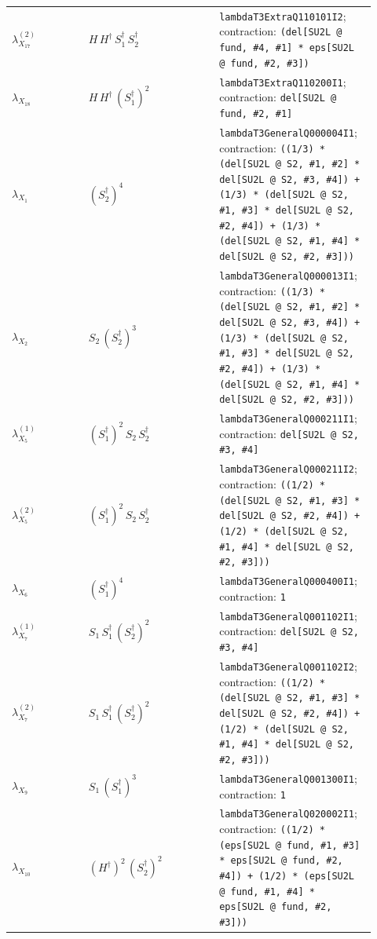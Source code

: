 \documentclass[8pt]{article}
\begin{document}
\begin{landscape}
\begin{longtable}{@{}p{0.20\linewidth}p{0.34\linewidth}p{0.38\linewidth}@{}}
$\lambda_{X_{17}}^{(2)}$ & $H\,H^\dagger\,S_1^\dagger\,S_2^\dagger$ & \texttt{lambdaT3ExtraQ110101I2}; contraction: \texttt{(del[SU2L @ fund, \#4, \#1] * eps[SU2L @ fund, \#2, \#3])} \\
$\lambda_{X_{18}}$ & $H\,H^\dagger\,(S_1^\dagger)^{2}$ & \texttt{lambdaT3ExtraQ110200I1}; contraction: \texttt{del[SU2L @ fund, \#2, \#1]} \\
$\lambda_{X_{1}}$ & $(S_2^\dagger)^{4}$ & \texttt{lambdaT3GeneralQ000004I1}; contraction: \texttt{((1/3) * (del[SU2L @ S2, \#1, \#2] * del[SU2L @ S2, \#3, \#4]) + (1/3) * (del[SU2L @ S2, \#1, \#3] * del[SU2L @ S2, \#2, \#4]) + (1/3) * (del[SU2L @ S2, \#1, \#4] * del[SU2L @ S2, \#2, \#3]))} \\
$\lambda_{X_{2}}$ & $S_2\,(S_2^\dagger)^{3}$ & \texttt{lambdaT3GeneralQ000013I1}; contraction: \texttt{((1/3) * (del[SU2L @ S2, \#1, \#2] * del[SU2L @ S2, \#3, \#4]) + (1/3) * (del[SU2L @ S2, \#1, \#3] * del[SU2L @ S2, \#2, \#4]) + (1/3) * (del[SU2L @ S2, \#1, \#4] * del[SU2L @ S2, \#2, \#3]))} \\
$\lambda_{X_{5}}^{(1)}$ & $(S_1^\dagger)^{2}\,S_2\,S_2^\dagger$ & \texttt{lambdaT3GeneralQ000211I1}; contraction: \texttt{del[SU2L @ S2, \#3, \#4]} \\
$\lambda_{X_{5}}^{(2)}$ & $(S_1^\dagger)^{2}\,S_2\,S_2^\dagger$ & \texttt{lambdaT3GeneralQ000211I2}; contraction: \texttt{((1/2) * (del[SU2L @ S2, \#1, \#3] * del[SU2L @ S2, \#2, \#4]) + (1/2) * (del[SU2L @ S2, \#1, \#4] * del[SU2L @ S2, \#2, \#3]))} \\
$\lambda_{X_{6}}$ & $(S_1^\dagger)^{4}$ & \texttt{lambdaT3GeneralQ000400I1}; contraction: \texttt{1} \\
$\lambda_{X_{7}}^{(1)}$ & $S_1\,S_1^\dagger\,(S_2^\dagger)^{2}$ & \texttt{lambdaT3GeneralQ001102I1}; contraction: \texttt{del[SU2L @ S2, \#3, \#4]} \\
$\lambda_{X_{7}}^{(2)}$ & $S_1\,S_1^\dagger\,(S_2^\dagger)^{2}$ & \texttt{lambdaT3GeneralQ001102I2}; contraction: \texttt{((1/2) * (del[SU2L @ S2, \#1, \#3] * del[SU2L @ S2, \#2, \#4]) + (1/2) * (del[SU2L @ S2, \#1, \#4] * del[SU2L @ S2, \#2, \#3]))} \\
$\lambda_{X_{9}}$ & $S_1\,(S_1^\dagger)^{3}$ & \texttt{lambdaT3GeneralQ001300I1}; contraction: \texttt{1} \\
$\lambda_{X_{10}}$ & $(H^\dagger)^{2}\,(S_2^\dagger)^{2}$ & \texttt{lambdaT3GeneralQ020002I1}; contraction: \texttt{((1/2) * (eps[SU2L @ fund, \#1, \#3] * eps[SU2L @ fund, \#2, \#4]) + (1/2) * (eps[SU2L @ fund, \#1, \#4] * eps[SU2L @ fund, \#2, \#3]))} \\

\end{longtable}
\end{landscape}
\end{document}
